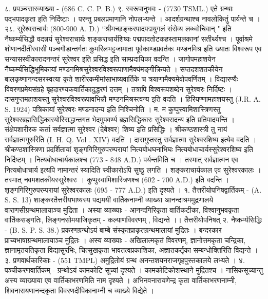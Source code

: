 ८. प्रपञ्चसारव्याख्या - (686 C. C. P. B.)
९. स्वरूपानुभवः - (7730 TSML.)
एते ग्रन्थाः पद्भपादकृता इति निर्दिष्टाः । परन्तु प्रबलप्रमाणानि नोपलभ्यन्ते । आदर्शग्रन्थाश्च नावलोकितुं पार्यन्ते च ।
२८. सुरेश्वराचार्यः (800-900 A. D.)
``श्रीमच्छङ्करपादपद्मयुगलं संसेव्य लब्ध्वोचिवान् " इति नैष्कर्म्यसिद्धौ वदन्नयं सुरेश्वराचार्यः शङ्कराचार्यशिष्यः पद्मपादतोटकहस्तामलकानां सतीर्थ्यश्च ।
पूर्वाश्रमे शोणानदीतीरवासी पञ्चगौडान्तर्गतः कुमरिलभट्टजामाता पूर्वकाण्डप्रवर्तकः मण्डनमिश्र इति ख्यातः विश्वरूप एव सन्यासस्वीकारादनन्तरं सुरेश्वर इति प्रसिद्ध इति साम्प्रदायिका वदन्ति । जागोपमहाशयेन नैष्कर्म्यसिद्धिभूमिकायां मण्डनमिश्रसुरेश्वरविश्वरूपाणामैक्यंमङ्गीक्रियते । सप्तदशशतकीयेन बालकृष्णानन्दसरस्वत्या कृते शारीरकमीमांसाभाष्यवार्तिके च त्रयाणामैक्यमेवोपवर्णितम् । विद्यारण्यैः विवरणप्रमेयसंग्रहे बृहदारण्यकवार्तिकादुद्धरणं दत्तम् । तत्रापि विश्वरूपशब्देन सुरेश्वरः निर्दिष्टः ।
दासगुप्तमहाशयस्तु सुरेश्वरविश्वरूपावभिन्नौ मण्डनमिश्रस्त्वन्य इति वदति । हिरियण्णामहाशयस्तु (J.R. A. S. 1924) पत्रिकायां सुरेश्वरः मण्डनादन्य इति निश्चिनोति । म. म कुप्पुस्वामिशास्त्रिणस्तु सुरेश्वरब्रह्मसिद्धिकारयोस्सिद्धान्तगत भेदमुपवर्ण्य ब्रह्मसिद्धिकारः सुरेश्वरादन्य इति प्रतिपादयन्ति । संक्षेपशारीरक कर्ता सर्वज्ञात्मा सुरेश्वर (देबेश्वर) शिष्य इति प्रसिद्धिः । श्रीकण्ठशास्त्री तु नायं सर्वज्ञात्मगुरुरिति (I. H. Q. Vol . XIV) वदति । दासगुप्तस्तु सर्वज्ञात्मा सुरेश्वरशिष्य इत्येव वदति । श्रीकण्ठशास्त्रिणा प्रदर्शितायां शृङ्गगिरिगुरुपरम्परायां नित्यबोधघनाभिघः नित्यबोधाचार्यस्सुरेश्वरशिष्य इति निर्दिष्टम् । नित्यबोधाचार्यकालश्च (773 - 848 A.D.) पर्यन्तमिति च । तस्मात् सर्वज्ञात्मन एव नित्यबोधाचार्य इत्यपि नामान्तरं स्यादिति स्वीकारोऽपि सुष्ठु लगति ।
शङ्कराचार्यकाल एव सुरेश्वरकालः । तस्मात् नवमशतकीयस्सुरेश्वरः । कुप्पुस्वामिशास्त्रिणश्च  (602 - 700 A.D.) इति वदन्ति । शृङ्गगिरिगुरुपरम्परायां सुरेश्वरकालः (695 - 777 A.D.) इति दृश्यते ।
१. तैत्तरीयोपनिषद्वार्तिकम् - (A. S. S. 13)
शाङ्करतैत्तरीयभाष्यस्य पद्यमयी वार्तिकनाम्नी व्याख्या आनन्दाश्रममुद्रणालये वाराणसीग्रन्थमालायाञ्च मुद्रिता । अस्या व्याख्याः - आनन्दगिरिकृता वार्तिकटीका, विश्वानुभवकृता वार्तिकसङ्गतिः, लिङ्गनसोमयाजिकृतम् - कल्याणविवरणम् , विद्यन्ते ।।
तैत्तरीयोपनिषत्
२. नैष्कर्म्यसिद्धिः - (B. S. P. S. 38.)
प्रकरणग्रन्थोऽयं बाम्बे संस्कृतप्राकृतग्रन्थमालायां मुद्रितः । बन्दरकार प्राच्यभाषाग्रन्थमालायाञ्च मुद्रितः । अस्य व्याख्याः - अखिलात्मकृतं विवरणम्, ज्ञानोत्तमकृता चन्द्रिका, ज्ञानामृतयतिकृता विद्यासुरभिः, चित्सुखकृता भावतत्वप्रकाशिका, अज्ञातकर्तृका सम्बन्धोक्तिरिति विद्यन्ते ।
३. प्रणवार्थकारिकाः - (551 TMPL)
अमुद्रितोयं ग्रन्थ अनन्तशयनराजगृहपुस्तकालये लभ्यते ।
४. पञ्चीकरणवार्तिकम् -
ग्रन्थोऽयं कामकोटि सूच्यां दृश्यते । कामकोटिकोशस्थाने मुद्रितश्च । नासिकसूच्यान्तु अस्य व्याख्याया एव वार्तिकाभरणमिति नाम दृश्यते । अभिनवनारायणेन्द्र कृता वार्तिकाभरणनाम्नी, शिवनारायणानन्दकृता विवरणदीपिकानाम्नी च व्याख्ये विद्येते ।
